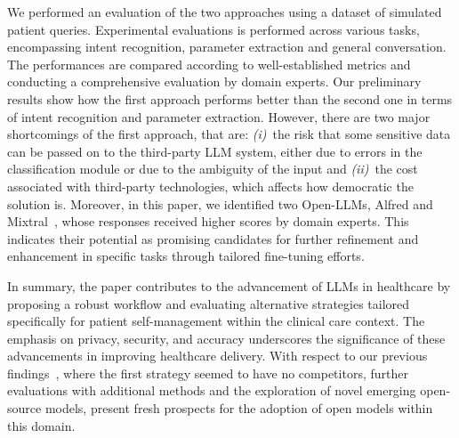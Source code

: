 \documentclass[preprint,12pt]{elsarticle}
\begin{document}
We performed an evaluation of the two approaches using a dataset of simulated patient queries. 
%
Experimental evaluations is performed across various tasks, encompassing intent recognition, parameter extraction and general conversation. 
%
The performances are compared according to well-established metrics and conducting a comprehensive evaluation by domain experts.
%
Our preliminary results show how the first approach performs better than the second one in terms of intent recognition and parameter extraction. 
%
However, there are two major shortcomings of the first approach, that are: 
%
\emph{(i)}~the risk that some sensitive data can be passed on to the third-party LLM system, either due to errors in the classification module or due to the ambiguity of the input and
%
\emph{(ii)}~the cost associated with third-party technologies, which affects how democratic the solution is.
%
Moreover, in this paper, we identified two Open-LLMs, Alfred and Mixtral~\cite{mixtral}, whose responses received higher scores by domain experts.
%
This indicates their potential as promising candidates for further refinement and enhancement in specific tasks through tailored fine-tuning efforts.






In summary, the paper contributes to the advancement of LLMs in healthcare by proposing a robust workflow and evaluating alternative strategies tailored specifically for patient self-management within the clinical care context.
%
The emphasis on privacy, security, and accuracy underscores the significance of these advancements in improving healthcare delivery.
%
With respect to our previous findings~\cite{MontagnaTELMED2024}, where the first strategy seemed to have no competitors, further evaluations with additional methods and the exploration of novel emerging open-source models, present fresh prospects for the adoption of open models within this domain. 
%
\end{document}
